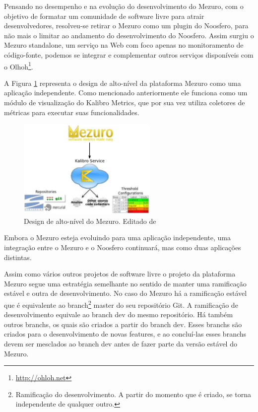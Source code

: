 Pensando no desempenho e na evolução do desenvolvimento do Mezuro, com o objetivo de formatar um comunidade de software livre para atrair desenvolvedores, resolveu-se retirar o Mezuro como um plugin do Noosfero, para não mais o limitar ao andamento do desenvolvimento do Noosfero. Assim surgiu o Mezuro standalone, um serviço na Web com foco apenas no monitoramento de código-fonte, podemos se integrar e complementar outros serviços disponíveis com o Olhoh\footnote{\url{http://ohloh.net}}.

A Figura \ref{mezuro-design} representa o design de alto-nível da plataforma Mezuro como uma aplicação independente. Como mencionado anteriormente ele funciona como um módulo de visualização do Kalibro Metrics, que por sua vez utiliza coletores de métricas para executar suas funcionalidades.

\graphicspath{{figuras/}}
\begin{figure}[H]
\centering
\includegraphics[width=0.6\textwidth]{mezuro-standalone-design}
\caption{Design de alto-nível do Mezuro. Editado de \cite{meirelles2010mezuro}}
\label{mezuro-design}
\end{figure}

Embora o Mezuro esteja evoluindo para uma aplicação independente, uma integração entre o Mezuro e o Noosfero continuará, mas como duas aplicações distintas.

Assim como vários outros projetos de software livre o projeto da plataforma Mezuro segue uma estratégia semelhante no sentido de manter uma ramificação estável e outra de desenvolvimento. No caso do Mezuro há a ramificação estável que é equivalente ao branch\footnote{Ramificação do desenvolvimento. A partir do momento que é criado, se torna independente de qualquer outro.} master do seu repositório Git. A ramificação de desenvolvimento equivale ao branch dev do mesmo repositório. Há também outros branchs, os quais são criados a partir do branch dev. Esses branchs são criados para o desenvolvimento de novas features, e ao concluí-las esses branchs devem ser mesclados ao branch dev antes de fazer parte da versão estável do Mezuro.

